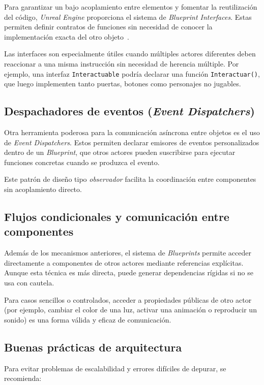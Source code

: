 Para garantizar un bajo acoplamiento entre elementos y fomentar la reutilización del código, \textit{Unreal Engine} proporciona el sistema de \textit{Blueprint Interfaces}. Estas permiten definir contratos de funciones sin necesidad de conocer la implementación exacta del otro objeto~\cite{millerblueprintcpp}.

Las interfaces son especialmente útiles cuando múltiples actores diferentes deben reaccionar a una misma instrucción sin necesidad de herencia múltiple. Por ejemplo, una interfaz \texttt{Interactuable} podría declarar una función \texttt{Interactuar()}, que luego implementen tanto puertas, botones como personajes no jugables.

\subsection{Despachadores de eventos (\textit{Event Dispatchers})}

Otra herramienta poderosa para la comunicación asíncrona entre objetos es el uso de \textit{Event Dispatchers}. Estos permiten declarar emisores de eventos personalizados dentro de un \textit{Blueprint}, que otros actores pueden suscribirse para ejecutar funciones concretas cuando se produzca el evento.

Este patrón de diseño tipo \textit{observador} facilita la coordinación entre componentes sin acoplamiento directo.

\subsection{Flujos condicionales y comunicación entre componentes}

Además de los mecanismos anteriores, el sistema de \textit{Blueprints} permite acceder directamente a componentes de otros actores mediante referencias explícitas. Aunque esta técnica es más directa, puede generar dependencias rígidas si no se usa con cautela.

Para casos sencillos o controlados, acceder a propiedades públicas de otro actor (por ejemplo, cambiar el color de una luz, activar una animación o reproducir un sonido) es una forma válida y eficaz de comunicación.

\subsection{Buenas prácticas de arquitectura}

Para evitar problemas de escalabilidad y errores difíciles de depurar, se recomienda:


